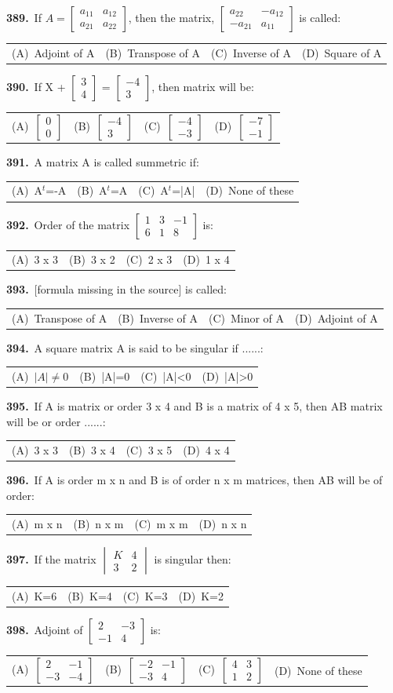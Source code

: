 \documentclass[11pt,a4paper]{article}
\makeatletter
\newcommand{\mcq}[6]{%
  \Needspace{4\baselineskip}%
  \par\medskip\noindent\textbf{#1.}\ #2\par\nopagebreak
  \noindent\begin{tabularx}{\linewidth}{@{\hspace{1.5em}}*{4}{>{\raggedright\arraybackslash}X}@{}}
    (A)~#3 & (B)~#4 & (C)~#5 & (D)~#6
  \end{tabularx}\par}
\makeatother
\begin{document}
\mcq{389}{If $A=\begin{bmatrix}a_{11}&a_{12}\\a_{21}&a_{22}\end{bmatrix}$, then the matrix, $\begin{bmatrix}a_{22}&-a_{12}\\-a_{21}&a_{11}\end{bmatrix}$ is called:}{Adjoint of A}{Transpose of A}{Inverse of A}{Square of A}
\mcq{390}{If X + $\begin{bmatrix}3\\4\end{bmatrix}$ = $\begin{bmatrix}-4\\3\end{bmatrix}$, then matrix will be:}{$\begin{bmatrix}0\\0\end{bmatrix}$}{$\begin{bmatrix}-4\\3\end{bmatrix}$}{$\begin{bmatrix}-4\\-3\end{bmatrix}$}{$\begin{bmatrix}-7\\-1\end{bmatrix}$}
\mcq{391}{A matrix A is called summetric if:}{A$^{t}$=-A}{A$^{t}$=A}{A$^{t}$=|A|}{None of these}
\mcq{392}{Order of the matrix $\begin{bmatrix}1&3&-1\\6&1&8\end{bmatrix}$ is:}{3 x 3}{3 x 2}{2 x 3}{1 x 4}
\mcq{393}{[formula missing in the source] is called:}{Transpose of A}{Inverse of A}{Minor of A}{Adjoint of A}
\mcq{394}{A square matrix A is said to be singular if ......:}{$|A|\neq0$}{|A|=0}{|A|<0}{|A|>0}
\mcq{395}{If A is matrix or order 3 x 4 and B is a matrix of 4 x 5, then AB matrix will be or order ......:}{3 x 3}{3 x 4}{3 x 5}{4 x 4}
\mcq{396}{If A is order m x n and B is of order n x m matrices, then AB will be of order:}{m x n}{n x m}{m x m}{n x n}
\mcq{397}{If the matrix $\begin{vmatrix}K&4\\3&2\end{vmatrix}$ is singular then:}{K=6}{K=4}{K=3}{K=2}
\mcq{398}{Adjoint of $\begin{bmatrix}2&-3\\-1&4\end{bmatrix}$ is:}{$\begin{bmatrix}2&-1\\-3&-4\end{bmatrix}$}{$\begin{bmatrix}-2&-1\\-3&4\end{bmatrix}$}{$\begin{bmatrix}4&3\\1&2\end{bmatrix}$}{None of these}
\end{document}
